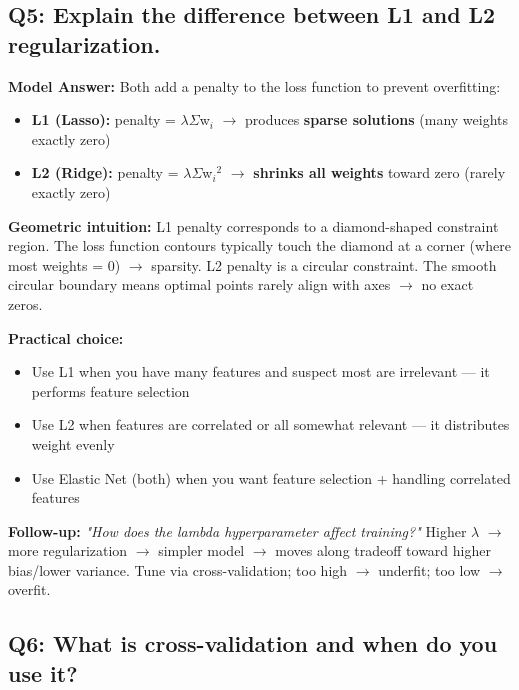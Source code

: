 \documentclass[11pt]{article}
\providecommand{\tightlist}{\setlength{\itemsep}{1pt}\setlength{\parskip}{0pt}}
\begin{document}
\subsection{Q5: Explain the difference between L1 and L2 regularization.}\label{q5-explain-the-difference-between-l1-and-l2-regularization}

\textbf{Model Answer:}
Both add a penalty to the loss function to prevent overfitting:

\begin{itemize}
\tightlist
\item
  \textbf{L1 (Lasso):} penalty = \(\lambda\)\(\Sigma\)\textbar w\(_i\)\textbar{} \(\rightarrow\) produces \textbf{sparse solutions} (many weights exactly zero)
\item
  \textbf{L2 (Ridge):} penalty = \(\lambda\)\(\Sigma\)w\(_i\)\(^2\) \(\rightarrow\) \textbf{shrinks all weights} toward zero (rarely exactly zero)
\end{itemize}

\textbf{Geometric intuition:}
L1 penalty corresponds to a diamond-shaped constraint region. The loss function contours typically touch the diamond at a corner (where most weights = 0) \(\rightarrow\) sparsity.
L2 penalty is a circular constraint. The smooth circular boundary means optimal points rarely align with axes \(\rightarrow\) no exact zeros.

\textbf{Practical choice:}

\begin{itemize}
\tightlist
\item
  Use L1 when you have many features and suspect most are irrelevant --- it performs feature selection
\item
  Use L2 when features are correlated or all somewhat relevant --- it distributes weight evenly
\item
  Use Elastic Net (both) when you want feature selection + handling correlated features
\end{itemize}

\textbf{Follow-up:} \emph{"How does the lambda hyperparameter affect training?"}
Higher \(\lambda\) \(\rightarrow\) more regularization \(\rightarrow\) simpler model \(\rightarrow\) moves along tradeoff toward higher bias/lower variance. Tune via cross-validation; too high \(\rightarrow\) underfit; too low \(\rightarrow\) overfit.

\subsection{Q6: What is cross-validation and when do you use it?}\label{q6-what-is-cross-validation-and-when-do-you-use-it}
\end{document}
